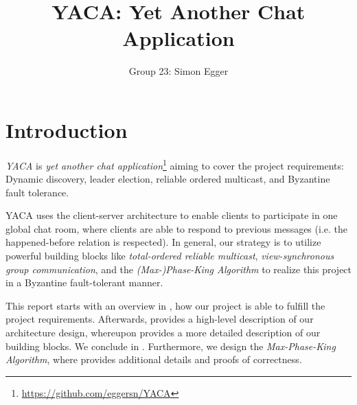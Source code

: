 \documentclass[runningheads]{llncs}
\begin{document}
%
\title{YACA: Yet Another Chat Application}

\author{Group 23: Simon Egger}

\institute{}
%
\maketitle              %

\section{Introduction}
\textit{YACA} is \textit{yet another chat application}\footnote{\url{https://github.com/eggersn/YACA}} aiming to cover the project requirements: Dynamic discovery, leader election, reliable ordered multicast, and Byzantine fault tolerance.

YACA uses the client-server architecture to enable clients to participate in one global chat room, where clients are able to respond to previous messages (i.e. the happened-before relation is respected). In general, our strategy is to utilize powerful building blocks like \textit{total-ordered reliable multicast}, \textit{view-synchronous group communication}, and the \textit{(Max-)Phase-King Algorithm} to realize this project in a Byzantine fault-tolerant manner.

This report starts with an overview in , how our project is able to fulfill the project requirements. Afterwards,  provides a high-level description of our architecture design, whereupon  provides a more detailed description of our building blocks. We conclude in . Furthermore, we design the \textit{Max-Phase-King Algorithm}, where  provides additional details and proofs of correctness. 
\end{document}
